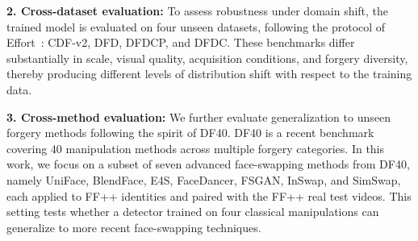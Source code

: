 \documentclass[fonts]{icst}
\newif\ifrevmark\revmarktrue
\newcommand{\rev}[1]{\ifrevmark{\color{revblue}#1}\else#1\fi}
\begin{document}
\begin{table}[!t]
\centering
\captionsetup{labelsep=period, labelfont=bf, hypcap=false}
\caption{Benchmarking results of cross-dataset evaluations (Protocol-\rev{2}) and cross-method evaluations (Protocol-\rev{3}).
All detectors are trained on FF++ c23~\cite{rossler2019ff} and evaluated on other fake data.
\rev{The results of other methods are taken from Table~1 of Effort~\cite{yan2025effort} and, for ForAda and GenD, from their papers; $\dagger$ marks the authors' released checkpoints. These numbers come from different training recipes and checkpoint-selection rules (Sec.~\ref{sec:selection}) and are not directly comparable with our row, which is selected on FF++ validation only and averaged over $n$ seeds.} Bold: best; shaded: second best.}
\label{tab:comparison}
\label{tab:literature}
\vspace{2mm}
\resizebox{\textwidth}{!}{}
\vspace{3mm}

\centering
\captionsetup{labelsep=period, labelfont=bf, hypcap=false}
\caption{\rev{Video AUC of re-trained methods under the same protocol (FF++ c23 training, checkpoint selected on the FF++ validation split). Avg(D) and Avg(M) are mean $\pm$ standard deviation over $n$ seeds; per-dataset values are seed means. Params: trainable parameters of the deployed model. Bold: best; shaded: second best.}}
\label{tab:main}
\vspace{2mm}
\resizebox{\textwidth}{!}{}
\end{table}

\textbf{2. Cross-dataset evaluation:}
To assess robustness under domain shift, the trained model is evaluated on \rev{four} unseen datasets\rev{, following the protocol of Effort~\cite{yan2025effort}}: CDF-v2, DFD, DFDCP, and DFDC.
These benchmarks differ substantially in scale, visual quality, acquisition conditions, and forgery diversity, thereby producing different levels of distribution shift with respect to the training data.

\textbf{3. Cross-method evaluation:}
We further evaluate generalization to unseen forgery methods following the spirit of DF40.
DF40 is a recent benchmark covering 40 manipulation methods across multiple forgery categories.
In this work, we focus on a subset of seven advanced face-swapping methods from DF40, namely UniFace, BlendFace, E4S, FaceDancer, FSGAN, InSwap, and SimSwap\rev{, each applied to FF++ identities and paired with the FF++ real test videos}.
This setting tests whether a detector trained on four classical manipulations can generalize to more recent face-swapping techniques.
\end{document}
